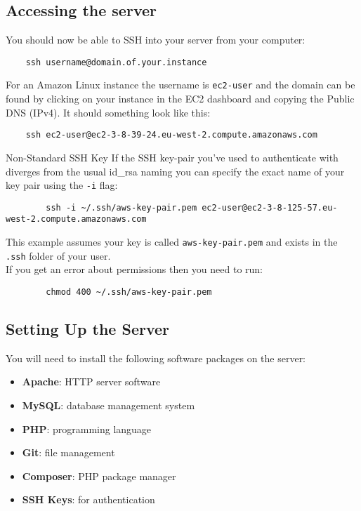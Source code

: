 \subsection{Accessing the server}

You should now be able to SSH into your server from your computer:

\begin{verbatim}
    ssh username@domain.of.your.instance
\end{verbatim}

For an Amazon Linux instance the username is \texttt{ec2-user} and the domain can be found by clicking on your instance in the EC2 dashboard and copying the Public DNS (IPv4). It should something look like this:

\begin{verbatim}
    ssh ec2-user@ec2-3-8-39-24.eu-west-2.compute.amazonaws.com
\end{verbatim}

\begin{infobox}{Non-Standard SSH Key}
    If the SSH key-pair you've used to authenticate with diverges from the usual id\_rsa naming you can specify the exact name of your key pair using the \texttt{-i} flag:

    \begin{verbatim}
        ssh -i ~/.ssh/aws-key-pair.pem ec2-user@ec2-3-8-125-57.eu-west-2.compute.amazonaws.com
    \end{verbatim}

    This example assumes your key is called \texttt{aws-key-pair.pem} and exists in the \texttt{.ssh} folder of your user.
    \\

    If you get an error about permissions then you need to run:

    \begin{verbatim}
        chmod 400 ~/.ssh/aws-key-pair.pem
    \end{verbatim}
\end{infobox}

\pagebreak

\subsection{Setting Up the Server}

You will need to install the following software packages on the server:

\begin{itemize}
    \item \textbf{Apache}: HTTP server software
    \item \textbf{MySQL}: database management system
    \item \textbf{PHP}: programming language
    \item \textbf{Git}: file management
    \item \textbf{Composer}: PHP package manager
    \item \textbf{SSH Keys}: for authentication
\end{itemize}

